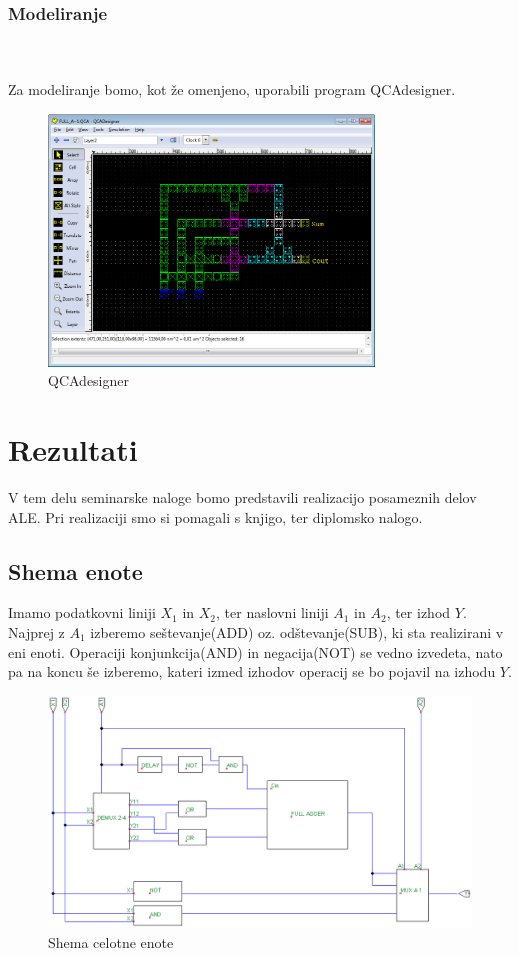\documentclass[seminar, slovene]{FRIreport}
\begin{document}
\subsubsection{Modeliranje}\ \\ \ \\
Za modeliranje bomo, kot že omenjeno, uporabili program QCAdesigner.
\begin{figure}[H]
\begin{center}
\includegraphics[width=8.65cm]{qca/img/qcadesigner}
\caption{QCAdesigner}
\end{center}
\end{figure}
%
\section{Rezultati}
V tem delu seminarske naloge bomo predstavili realizacijo posameznih delov ALE. Pri realizaciji smo si pomagali s knjigo\cite{virant:2007}, ter diplomsko nalogo\cite{orac:2007}.
\subsection{Shema enote}
Imamo podatkovni liniji $X_1$ in $X_2$, ter naslovni liniji $A_1$ in $A_2$, ter izhod $Y$. Najprej z $A_1$ izberemo seštevanje(ADD) oz. odštevanje(SUB), ki sta realizirani v eni enoti. Operaciji konjunkcija(AND) in negacija(NOT) se vedno izvedeta, nato pa na koncu še izberemo, kateri izmed izhodov operacij se bo pojavil na izhodu $Y$.
\begin{figure}[H]
\begin{center}
\includegraphics[width=16cm]{vezja/img/alu}
\caption{Shema celotne enote}
\end{center}
\end{figure}
\end{document}
